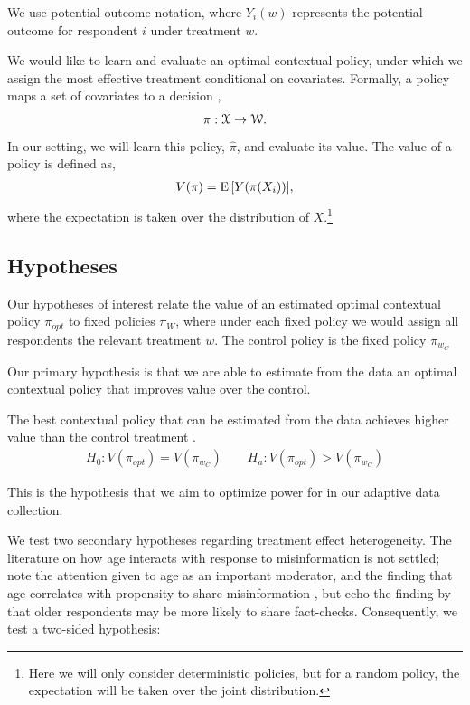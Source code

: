 \documentclass[letterpaper, 12pt, parskip=full,]{scrartcl}
\begin{document}
We use potential outcome notation, where $Y_i(w)$ represents the potential outcome for respondent $i$ under treatment $w$.%


We would like to learn and evaluate an optimal contextual policy, under which we assign the most effective treatment conditional on covariates. Formally, a policy maps a set of covariates to a decision \citep{athey2017efficient}, %
\begin{align}
  \pi: {\EuScript X} \rightarrow {\EuScript W}. 
  \label{eq:policy}
\end{align}
In our setting, we will learn this policy, $\hat \pi$, and evaluate its value. The value of a policy is defined as, 
\begin{align}
V(\pi) =  {\textrm E}\,[Y(\pi(X_{i}))],
  \label{eq:policy_value}
\end{align}
where the expectation is taken over the distribution of $X$.\footnote{Here we will only consider deterministic policies, but for a random policy, the expectation will be taken over the joint distribution. }

\subsection{Hypotheses}\label{hypotheses}

Our hypotheses of interest relate the value of an estimated optimal contextual policy $\pi_{opt}$ to fixed policies $\pi_{W}$, where under each fixed policy we would assign all respondents the relevant treatment $w$. The control policy is the fixed policy $\pi_{w_{C}}$

Our primary hypothesis is that we are able to estimate from the data an optimal contextual policy that improves value over the control. 
  \begin{hypothesis}
  The best contextual policy that can be estimated from the data achieves higher value than the control treatment \label{eq:optctr}.
\begin{align}
  H_{0}: V(\pi_{opt}) = V(\pi_{w_{C}}) \qquad H_{a}:  V(\pi_{opt}) > V(\pi_{w_{C}})
\end{align}
\end{hypothesis}
This is the hypothesis that we aim to optimize power for in our adaptive data collection. 


We test two secondary hypotheses regarding treatment effect heterogeneity. The literature on how age interacts with response to misinformation is not settled; \cite{wittenberg2020misinformation} note the attention given to age as an important moderator, and the finding that age correlates with propensity to share misinformation \citep[e.g.,]{guess2019less}, but echo the finding by \cite{amazeen2019reinforcing} that older respondents may be more likely to share fact-checks. Consequently, we test a two-sided hypothesis:
\end{document}
